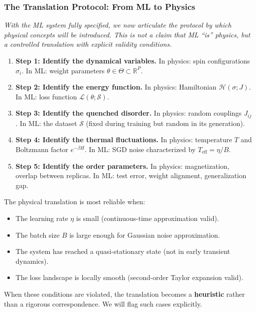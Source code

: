 \documentclass[
  journal=largetwo,
  simfonts=false,
  year=2025,
  volume=37,
]{cup-journal}
\begin{document}
\subsubsection{The Translation Protocol: From ML to Physics}

\textit{With the ML system fully specified, we now articulate the protocol by which physical concepts will be introduced. This is not a claim that ML ``is'' physics, but a controlled translation with explicit validity conditions.}

\begin{enumerate}
    \item \textbf{Step 1: Identify the dynamical variables.} In physics: spin configurations $\sigma_i$. In ML: weight parameters $\theta \in \Theta \subset \mathbb{R}^P$.
    
    \item \textbf{Step 2: Identify the energy function.} In physics: Hamiltonian $\mathcal{H}(\sigma; J)$. In ML: loss function $\mathcal{L}(\theta; \mathcal{S})$.
    
    \item \textbf{Step 3: Identify the quenched disorder.} In physics: random couplings $J_{ij}$. In ML: the dataset $\mathcal{S}$ (fixed during training but random in its generation).
    
    \item \textbf{Step 4: Identify the thermal fluctuations.} In physics: temperature $T$ and Boltzmann factor $e^{-\beta H}$. In ML: SGD noise characterized by $T_{\text{eff}} = \eta/B$.
    
    \item \textbf{Step 5: Identify the order parameters.} In physics: magnetization, overlap between replicas. In ML: test error, weight alignment, generalization gap.
\end{enumerate}

\begin{remark}
The physical translation is most reliable when:
\begin{itemize}
    \item The learning rate $\eta$ is small (continuous-time approximation valid).
    \item The batch size $B$ is large enough for Gaussian noise approximation.
    \item The system has reached a quasi-stationary state (not in early transient dynamics).
    \item The loss landscape is locally smooth (second-order Taylor expansion valid).
\end{itemize}
When these conditions are violated, the translation becomes a \textbf{heuristic} rather than a rigorous correspondence. We will flag such cases explicitly.
\end{remark}
\end{document}
